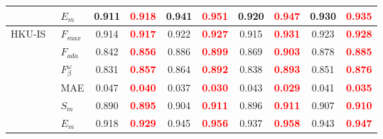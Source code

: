 \documentclass[runningheads]{llncs}
\begin{document}
\begin{table}[H]
{\begin{tabular}{l|l|cc|cc|cc|cc}
                                               & $E_{m}$                                                     & 0.911                           & \textcolor{red}{\textbf{0.918}} & 0.941                           & \textcolor{red}{\textbf{0.951}} & 0.920 & \textcolor{red}{\textbf{0.947}} & 0.930                           & \textcolor{red}{\textbf{0.935}} \\ \hline
   \multirow{6}{*}{HKU-IS~\cite{HKU-IS}}       & $F_{max}$                                                   & 0.914                           & \textcolor{red}{\textbf{0.917}} & 0.922                           & \textcolor{red}{\textbf{0.927}} & 0.915 & \textcolor{red}{\textbf{0.931}} & 0.923                           & \textcolor{red}{\textbf{0.928}} \\
                                               & $F_{ada}$                                                   & 0.842                           & \textcolor{red}{\textbf{0.856}} & 0.886                           & \textcolor{red}{\textbf{0.899}} & 0.869 & \textcolor{red}{\textbf{0.903}} & 0.878                           & \textcolor{red}{\textbf{0.885}} \\
                                               & $F^{\omega}_{\beta}$                                        & 0.831                           & \textcolor{red}{\textbf{0.857}} & 0.864                           & \textcolor{red}{\textbf{0.892}} & 0.838 & \textcolor{red}{\textbf{0.893}} & 0.851                           & \textcolor{red}{\textbf{0.876}} \\
                                               & MAE                                                         & 0.047                           & \textcolor{red}{\textbf{0.040}} & 0.037                           & \textcolor{red}{\textbf{0.030}} & 0.043 & \textcolor{red}{\textbf{0.029}} & 0.041                           & \textcolor{red}{\textbf{0.035}} \\
                                               & $S_{m}$                                                     & 0.890                           & \textcolor{red}{\textbf{0.895}} & 0.904                           & \textcolor{red}{\textbf{0.911}} & 0.896 & \textcolor{red}{\textbf{0.911}} & 0.907                           & \textcolor{red}{\textbf{0.910}} \\
                                               & $E_{m}$                                                     & 0.918                           & \textcolor{red}{\textbf{0.929}} & 0.945                           & \textcolor{red}{\textbf{0.956}} & 0.937 & \textcolor{red}{\textbf{0.958}} & 0.943                           & \textcolor{red}{\textbf{0.947}} \\ \hline

\end{tabular}}
\end{table}
\end{document}
